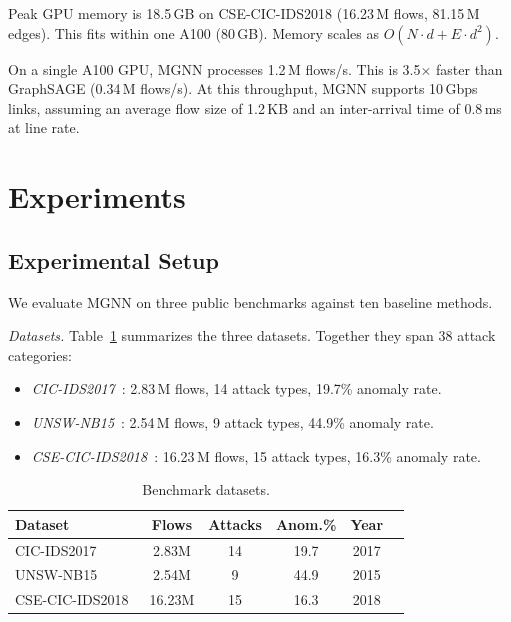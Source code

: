 \documentclass[conference]{IEEEtran}
\begin{document}
Peak GPU memory is 18.5\,GB on CSE-CIC-IDS2018 (16.23\,M flows, 81.15\,M edges). This fits within one A100 (80\,GB). Memory scales as $O(N \cdot d + E \cdot d^2)$.

On a single A100 GPU, MGNN processes 1.2\,M flows/s. This is 3.5$\times$ faster than GraphSAGE (0.34\,M flows/s). At this throughput, MGNN supports 10\,Gbps links, assuming an average flow size of 1.2\,KB and an inter-arrival time of 0.8\,ms at line rate.


\section{Experiments}

\subsection{Experimental Setup}
We evaluate MGNN on three public benchmarks against ten baseline methods.

\textit{Datasets.} Table~\ref{tab:dataset} summarizes the three datasets. Together they span 38 attack categories:

\begin{itemize}[nosep]
    \item \textit{CIC-IDS2017}~\cite{sharafaldin2018cic}: 2.83\,M flows, 14 attack types, 19.7\% anomaly rate.
    \item \textit{UNSW-NB15}~\cite{moustafa2015unsw}: 2.54\,M flows, 9 attack types, 44.9\% anomaly rate.
    \item \textit{CSE-CIC-IDS2018}~\cite{sharafaldin2018cic2}: 16.23\,M flows, 15 attack types, 16.3\% anomaly rate.
\end{itemize}

\begin{table}[t]
\caption{Benchmark datasets.}
\label{tab:dataset}
\centering
\footnotesize

\begin{tabular}{lccccc}
\toprule
Dataset & Flows & Attacks & Anom.\% & Year \\

\midrule
CIC-IDS2017~\cite{sharafaldin2018cic} & 2.83M & 14 & 19.7 & 2017 \\

UNSW-NB15~\cite{moustafa2015unsw} & 2.54M & 9 & 44.9 & 2015 \\

CSE-CIC-IDS2018~\cite{sharafaldin2018cic2} & 16.23M & 15 & 16.3 & 2018 \\

\bottomrule
\end{tabular}

\end{table}
\end{document}
